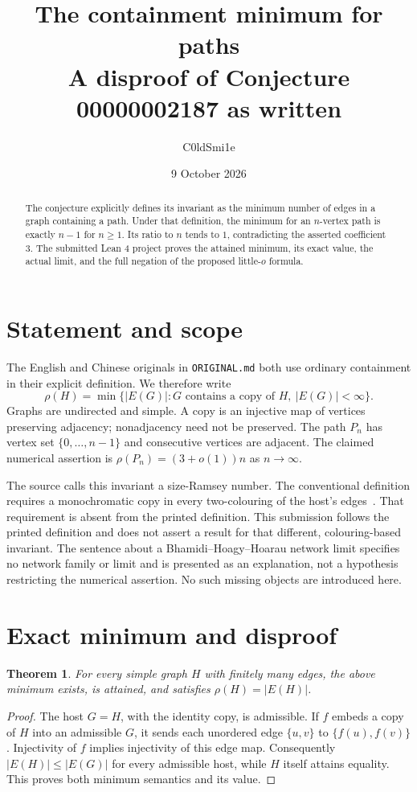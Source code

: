 \documentclass[10pt]{article}
\title{The containment minimum for paths\\[3pt]
\large A disproof of Conjecture 00000002187 as written}
\author{C0ldSmi1e}
\date{9 October 2026}
\newtheorem{theorem}{Theorem}
\newcommand{\code}[1]{\texttt{\small #1}}
\begin{document}
\maketitle
\vspace{-1.1em}

\begin{abstract}
The conjecture explicitly defines its invariant as the minimum number of
edges in a graph containing a path. Under that definition, the minimum for
an $n$-vertex path is exactly $n-1$ for $n\geq1$. Its ratio to $n$ tends to
$1$, contradicting the asserted coefficient $3$. The submitted Lean 4
project proves the attained minimum, its exact value, the actual limit,
and the full negation of the proposed little-$o$ formula.
\end{abstract}

\section{Statement and scope}
The English and Chinese originals in \code{ORIGINAL.md} both use ordinary
containment in their explicit definition. We therefore write
\[
 \rho(H)=\min\bigl\{|E(G)|: G\text{ contains a copy of }H,\ |E(G)|<\infty\bigr\}.
\]
Graphs are undirected and simple. A copy is an injective map of vertices
preserving adjacency; nonadjacency need not be preserved. The path $P_n$
has vertex set $\{0,\ldots,n-1\}$ and consecutive vertices are adjacent.
The claimed numerical assertion is $\rho(P_n)=(3+o(1))n$ as $n\to\infty$.

The source calls this invariant a size-Ramsey number. The conventional
definition requires a monochromatic copy in every two-colouring of the
host's edges~\cite{cfw}. That requirement is absent from the printed
definition. This submission follows the printed definition and does not
assert a result for that different, colouring-based invariant.
The sentence about a Bhamidi--Hoagy--Hoarau network limit specifies no
network family or limit and is presented as an explanation, not a
hypothesis restricting the numerical assertion. No such missing
objects are introduced here.

\section{Exact minimum and disproof}
\begin{theorem}
For every simple graph $H$ with finitely many edges, the above minimum
exists, is attained, and satisfies $\rho(H)=|E(H)|$.
\end{theorem}
\begin{proof}
The host $G=H$, with the identity copy, is admissible. If $f$ embeds a copy
of $H$ into an admissible $G$, it sends each unordered edge $\{u,v\}$ to
$\{f(u),f(v)\}$. Injectivity of $f$ implies injectivity of this edge map.
Consequently $|E(H)|\leq |E(G)|$ for every admissible host, while $H$
itself attains equality. This proves both minimum semantics and its value.
\end{proof}
\end{document}
